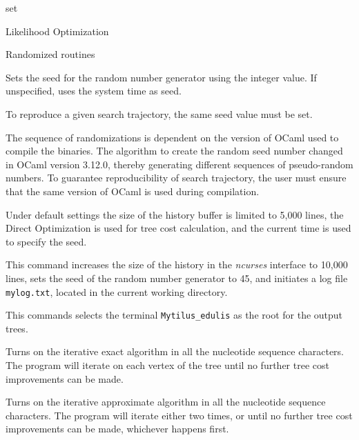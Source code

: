 \begin{command}{set}{}
\begin{arguments}
\begin{argumentgroup}{Likelihood Optimization}
\end{argumentgroup}

\begin{argumentgroup}{Randomized routines}
{}

{Sets the seed for the random number generator using the integer 
value. If unspecified, \poy uses the system time as seed.}
{}

\begin{statement}
To reproduce a given search trajectory, the same seed value must be set.
\end{statement}

\begin{statement}
The sequence of randomizations is dependent on the version of
OCaml used to compile the binaries. The algorithm to create the
random seed number changed in OCaml version 3.12.0, thereby
generating different sequences of pseudo-random numbers. To
guarantee reproducibility of search trajectory, the user must ensure that the
same version of OCaml is used during compilation.
\end{statement}

\end{argumentgroup}
\end{arguments}

{Under default settings the size of the history buffer is limited to
5,000 lines, the Direct Optimization is used for tree cost calculation,
and the current time is used to specify the seed.}

\begin{poyexamples}
{This command increases the size of the history in the \emph{ncurses}
interface to 10,000 lines, sets the seed of the random number generator to 45,
and initiates a log file \texttt{mylog.txt}, located in the current
working directory.}

{This commands selects the terminal \texttt{Mytilus\_edulis} as the root
for the output trees.}

{Turns on the iterative exact algorithm in all the nucleotide
sequence characters. The program will iterate on each vertex of the
tree until no further tree cost improvements can be made.}

{Turns on the iterative approximate algorithm in all the nucleotide
sequence characters. The program will iterate either two times, or
until no further tree cost improvements can be made, whichever
happens first.}


\end{poyexamples}
\end{command}
